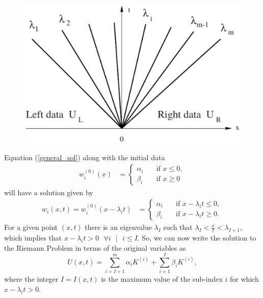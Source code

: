 \documentclass[]{article}
\begin{document}
		\begin{figure}[h] 	
			\centering
			\includegraphics[scale=.30]{CharacteristicFanRP}
			\caption{}
			\label{CharacteristicFanRP}
		\end{figure} 	
		Equation (\ref{general_sol}) along with the initial data
		\begin{equation}
	    	\begin{aligned}
			w^{(0)}_i(x) &= \left\{
			\begin{array}{ll}
			\alpha_i & \quad \mbox{if } x \leq 0, \\
			\beta_i & \quad \mbox{if } x \geq 0
			\end{array}
			\right.
			\end{aligned}
		\end{equation}
		will have a solution given by
		\begin{equation}	    \begin{aligned}
			w_i(x,t) = w^{(0)}_i(x - \lambda_i t) &= \left\{
			\begin{array}{ll}
			\alpha_i & \quad \mbox{if } x - \lambda_i t \leq 0, \\
			\beta_i & \quad \mbox{if } x - \lambda_i t \geq 0.
			\end{array}
			\right.					
			\end{aligned}
		\end{equation}
		For a given point $ (x,t)$ there is an eigenvalue $ \lambda_I $ such that $ \lambda_I < \frac{x}{t} < \lambda_{I+1}$, which implies that $ x - \lambda_i t > 0 \mbox{ } \forall i \mbox{ }| \mbox{ } i \leq I$. So, we can now write the solution to the Riemann Problem in terms of the original variables as 
		\begin{equation}
			U(x,t) = \sum_{i = I+1}^{m} \alpha_i K^{(i)} + \sum_{i = 1}^{I} \beta_i K^{(i)},
		\end{equation}where the integer $ I = I(x,t) $ is the maximum value of the sub-index $ i $ for which $ x - \lambda_i t > 0 $.
\end{document}
